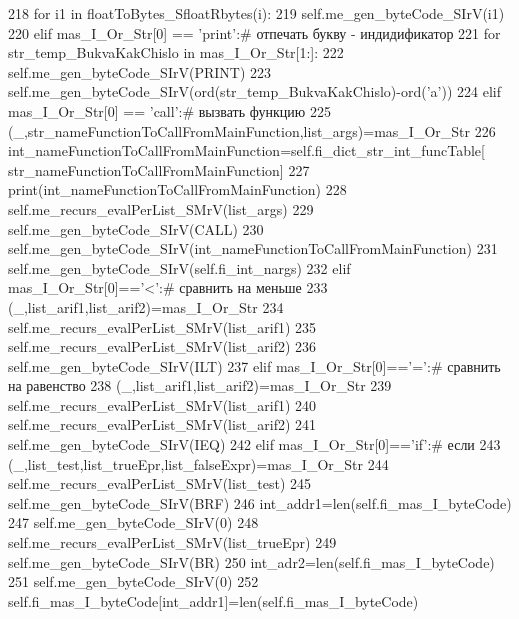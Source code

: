 \begin{DoxyCode}
{218                 \textcolor{keywordflow}{for} i1 \textcolor{keywordflow}{in} floatToBytes\_SfloatRbytes(i):
219                     self.me\_gen\_byteCode\_SIrV(i1)                    
220     \textcolor{keywordflow}{elif} mas\_I\_Or\_Str[0] == \textcolor{stringliteral}{'print'}:\textcolor{comment}{# отпечать букву - индидификатор}
221         \textcolor{keywordflow}{for} str\_temp\_BukvaKakChislo \textcolor{keywordflow}{in} mas\_I\_Or\_Str[1:]:  
222           self.me\_gen\_byteCode\_SIrV(PRINT)
223           self.me\_gen\_byteCode\_SIrV(ord(str\_temp\_BukvaKakChislo)-ord(\textcolor{stringliteral}{'a'}))
224     \textcolor{keywordflow}{elif} mas\_I\_Or\_Str[0] == \textcolor{stringliteral}{'call'}:\textcolor{comment}{# вызвать функцию}
225         (\_,str\_nameFunctionToCallFromMainFunction,list\_args)=mas\_I\_Or\_Str
226         int\_nameFunctionToCallFromMainFunction=self.fi\_dict\_str\_int\_funcTable[
      str\_nameFunctionToCallFromMainFunction]
227         print(int\_nameFunctionToCallFromMainFunction)
228         self.me\_recurs\_evalPerList\_SMrV(list\_args)
229         self.me\_gen\_byteCode\_SIrV(CALL)
230         self.me\_gen\_byteCode\_SIrV(int\_nameFunctionToCallFromMainFunction)
231         self.me\_gen\_byteCode\_SIrV(self.fi\_int\_nargs)
232     \textcolor{keywordflow}{elif} mas\_I\_Or\_Str[0]==\textcolor{stringliteral}{'<'}:\textcolor{comment}{# сравнить на меньше}
233         (\_,list\_arif1,list\_arif2)=mas\_I\_Or\_Str
234         self.me\_recurs\_evalPerList\_SMrV(list\_arif1)
235         self.me\_recurs\_evalPerList\_SMrV(list\_arif2)
236         self.me\_gen\_byteCode\_SIrV(ILT)
237     \textcolor{keywordflow}{elif} mas\_I\_Or\_Str[0]==\textcolor{stringliteral}{'='}:\textcolor{comment}{# сравнить на равенство}
238         (\_,list\_arif1,list\_arif2)=mas\_I\_Or\_Str
239         self.me\_recurs\_evalPerList\_SMrV(list\_arif1)
240         self.me\_recurs\_evalPerList\_SMrV(list\_arif2)
241         self.me\_gen\_byteCode\_SIrV(IEQ)        
242     \textcolor{keywordflow}{elif} mas\_I\_Or\_Str[0]==\textcolor{stringliteral}{'if'}:\textcolor{comment}{# если}
243         (\_,list\_test,list\_trueEpr,list\_falseExpr)=mas\_I\_Or\_Str
244         self.me\_recurs\_evalPerList\_SMrV(list\_test)
245         self.me\_gen\_byteCode\_SIrV(BRF)
246         int\_addr1=len(self.fi\_mas\_I\_byteCode)
247         self.me\_gen\_byteCode\_SIrV(0)
248         self.me\_recurs\_evalPerList\_SMrV(list\_trueEpr)
249         self.me\_gen\_byteCode\_SIrV(BR)
250         int\_adr2=len(self.fi\_mas\_I\_byteCode)
251         self.me\_gen\_byteCode\_SIrV(0)
252         self.fi\_mas\_I\_byteCode[int\_addr1]=len(self.fi\_mas\_I\_byteCode)
}
\end{DoxyCode}
